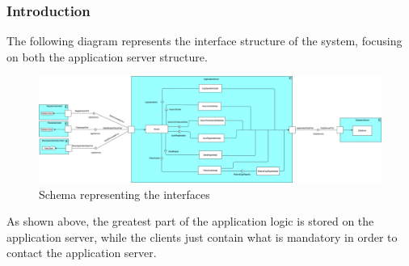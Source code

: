 \subsubsection{Introduction}
The following diagram represents the interface structure of the system, focusing on both the application server structure. \newline
\begin{figure}[h!]
	\centering
	\includegraphics[width=\textwidth]{Images/component_diagram_beta}
	\caption{Schema representing the interfaces}
\end{figure}

As shown above, the greatest part of the application logic is stored on the application server, while the clients just contain what is mandatory in order to contact the application server.
